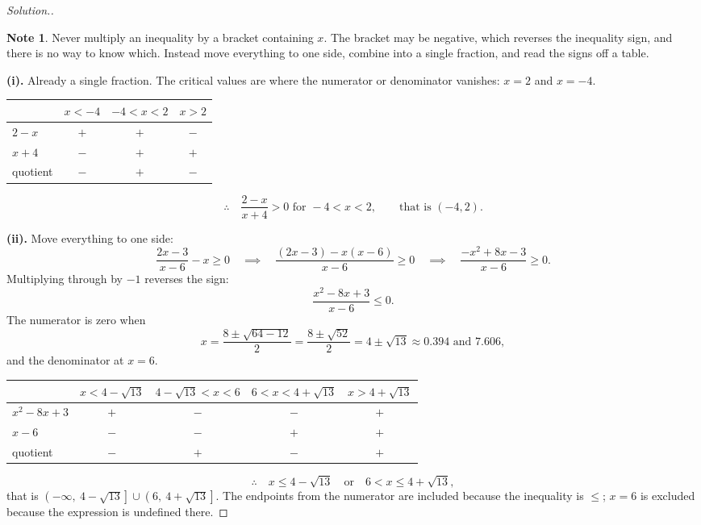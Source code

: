 \documentclass[11pt,a4paper]{article}
\theoremstyle{definition}
\newtheorem{note}[thm]{Note}
\newenvironment{solution}
  {\renewcommand{\qedsymbol}{}\begin{proof}[\textit{Solution}.]}
  {\end{proof}}
\begin{document}
\begin{solution}
\begin{note}
Never multiply an inequality by a bracket containing $x$. The bracket may be negative,
which reverses the inequality sign, and there is no way to know which. Instead move
everything to one side, combine into a single fraction, and read the signs off a table.
\end{note}

\textbf{(i).} Already a single fraction. The critical values are where the numerator or
denominator vanishes: $x=2$ and $x=-4$.

\begin{table}[H]
\centering
\begin{tabular}{|l|c|c|c|}
\hline
 & $x<-4$ & $-4<x<2$ & $x>2$\\
\hline
$2-x$ & $+$ & $+$ & $-$\\
$x+4$ & $-$ & $+$ & $+$\\
quotient & $-$ & $+$ & $-$\\
\hline
\end{tabular}
\end{table}

$$\therefore\quad \frac{2-x}{x+4}>0 \text{ for } -4<x<2,\qquad\text{that is } (-4,2).$$

\textbf{(ii).} Move everything to one side:
$$\frac{2x-3}{x-6}-x\geq 0\quad\implies\quad \frac{(2x-3)-x(x-6)}{x-6}\geq 0
\quad\implies\quad \frac{-x^2+8x-3}{x-6}\geq 0.$$
Multiplying through by $-1$ reverses the sign:
$$\frac{x^2-8x+3}{x-6}\leq 0.$$
The numerator is zero when
$$x=\frac{8\pm\sqrt{64-12}}{2}=\frac{8\pm\sqrt{52}}{2}=4\pm\sqrt{13}
\approx 0.394 \text{ and } 7.606,$$
and the denominator at $x=6$.

\begin{table}[H]
\centering
\begin{tabular}{|l|c|c|c|c|}
\hline
 & $x<4-\sqrt{13}$ & $4-\sqrt{13}<x<6$ & $6<x<4+\sqrt{13}$ & $x>4+\sqrt{13}$\\
\hline
$x^2-8x+3$ & $+$ & $-$ & $-$ & $+$\\
$x-6$ & $-$ & $-$ & $+$ & $+$\\
quotient & $-$ & $+$ & $-$ & $+$\\
\hline
\end{tabular}
\end{table}

$$\therefore\quad x\leq 4-\sqrt{13}\quad\text{or}\quad 6<x\leq 4+\sqrt{13},$$
that is $\left(-\infty,\ 4-\sqrt{13}\right]\cup\left(6,\ 4+\sqrt{13}\right]$. The
endpoints from the numerator are included because the inequality is $\leq$; $x=6$ is
excluded because the expression is undefined there.


\end{solution}
\end{document}
